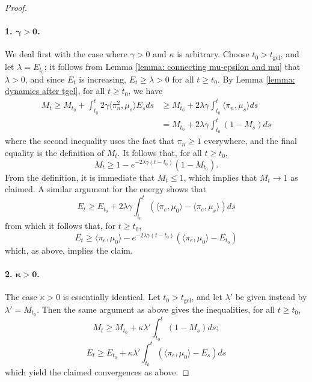 \begin{proof}
\paragraph{1. $\mathbf{\gamma>0}$.} We deal first with the case where $\gamma>0$ and $\kappa$ is arbitrary. Choose $t_0>t_\text{gel}$, and let $\lambda=E_{t_0}$; it follows from Lemma \ref{lemma: connecting mu-epsilon and mu} that $\lambda>0$, and since $E_t$ is increasing, $E_t\ge \lambda>0$ for all $t\ge t_0$. By Lemma \ref{lemma: dynamics after tgel}, for all $t\ge t_0$, we have \begin{equation} \begin{split} M_t\ge M_{t_0}+\int_{t_0}^t 2\gamma \langle \pi_n^2, \mu_s\rangle E_s ds & \ge M_{t_0}+2\lambda \gamma \int_{t_0}^t \langle \pi_n, \mu_s\rangle ds \\ & = M_{t_0}+2\lambda \gamma \int_{t_0}^t (1-M_s)ds\end{split}  \end{equation} where the second inequality uses the fact that $\pi_n \ge 1$ everywhere, and the final equality is the definition of $M_t$. It follows that, for all $t\ge t_0$, \begin{equation} M_t \ge 1-e^{-2\lambda \gamma (t-t_0)}(1-M_{t_0}). \end{equation} From the definition, it is immediate that $M_t\le 1$, which implies that $M_t\rightarrow 1$ as claimed. A similar argument for the energy shows that \begin{equation} E_t \ge E_{t_0} + 2\lambda \gamma  \int_{t_0}^t(\langle \pi_e, \mu_0\rangle -\langle \pi_e, \mu_s\rangle)ds\end{equation} from which it follows that, for $t\ge t_0$, \begin{equation} E_t\ge \langle \pi_e, \mu_0\rangle-e^{-2\lambda\gamma(t-t_0)}(\langle \pi_e, \mu_0\rangle - E_{t_0})  \end{equation}  which, as above, implies the claim.
\paragraph{2. $\mathbf{\kappa>0}$.} The case $\kappa>0$ is essentially identical. Let $t_0>t_\text{gel}$,  and let $\lambda'$ be given instead by $\lambda'=M_{t_0}$. Then the same argument as above gives the inequalities, for all $t\ge t_0$, \begin{equation} M_t \ge M_{t_0}+\kappa \lambda'\int_{t_0}^t (1-M_s)ds; \end{equation} \begin{equation}  E_t \ge E_{t_0}+\kappa \lambda'\int_{t_0}^t (\langle \pi_e, \mu_0\rangle-E_s)ds \end{equation} which yield the claimed convergences as above. \end{proof} 

